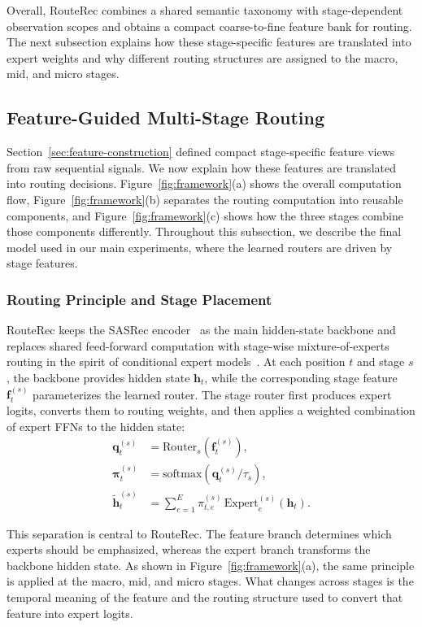 \documentclass[sigconf,anonymous,review]{acmart}
\begin{document}
Overall, RouteRec combines a shared semantic taxonomy with stage-dependent observation scopes and obtains a compact coarse-to-fine feature bank for routing. The next subsection explains how these stage-specific features are translated into expert weights and why different routing structures are assigned to the macro, mid, and micro stages.

\subsection{Feature-Guided Multi-Stage Routing}

Section~\ref{sec:feature-construction} defined compact stage-specific feature views from raw sequential signals. We now explain how these features are translated into routing decisions. Figure~\ref{fig:framework}(a) shows the overall computation flow, Figure~\ref{fig:framework}(b) separates the routing computation into reusable components, and Figure~\ref{fig:framework}(c) shows how the three stages combine those components differently. Throughout this subsection, we describe the final model used in our main experiments, where the learned routers are driven by stage features.

\subsubsection{Routing Principle and Stage Placement}

RouteRec keeps the SASRec encoder~\cite{kang2018sasrec} as the main hidden-state backbone and replaces shared feed-forward computation with stage-wise mixture-of-experts routing in the spirit of conditional expert models~\cite{shazeer2017moe,fedus2022switch}. At each position $t$ and stage $s$, the backbone provides hidden state $\mathbf{h}_t$, while the corresponding stage feature $\mathbf{f}^{(s)}_t$ parameterizes the learned router. The stage router first produces expert logits, converts them to routing weights, and then applies a weighted combination of expert FFNs to the hidden state:
\begin{align}
\mathbf{q}^{(s)}_t &= \mathrm{Router}_s(\mathbf{f}^{(s)}_t), \\
\boldsymbol{\pi}^{(s)}_t &= \mathrm{softmax}\!\left(\mathbf{q}^{(s)}_t / \tau_s\right), \\
\tilde{\mathbf{h}}^{(s)}_t &= \sum_{e=1}^{E} \pi^{(s)}_{t,e}\,\mathrm{Expert}^{(s)}_e(\mathbf{h}_t).
\end{align}

This separation is central to RouteRec. The feature branch determines which experts should be emphasized, whereas the expert branch transforms the backbone hidden state. As shown in Figure~\ref{fig:framework}(a), the same principle is applied at the macro, mid, and micro stages. What changes across stages is the temporal meaning of the feature and the routing structure used to convert that feature into expert logits.
\end{document}

